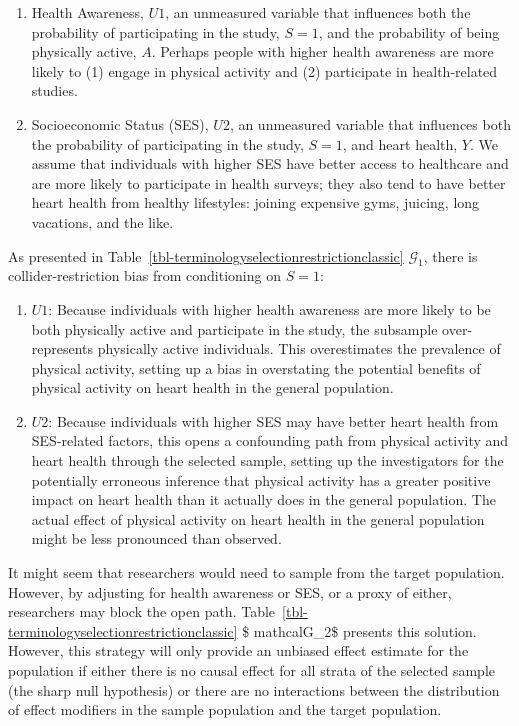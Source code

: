 \documentclass[
  single column]{article}
\begin{document}
\begin{enumerate}
\def\labelenumi{\arabic{enumi}.}
\item
  Health Awareness, \(U1\), an unmeasured variable that influences both
  the probability of participating in the study, \(\boxed{S = 1}\), and
  the probability of being physically active, \(A\). Perhaps people with
  higher health awareness are more likely to (1) engage in physical
  activity and (2) participate in health-related studies.
\item
  Socioeconomic Status (SES), \(U2\), an unmeasured variable that
  influences both the probability of participating in the study,
  \(\boxed{S = 1}\), and heart health, \(Y\). We assume that individuals
  with higher SES have better access to healthcare and are more likely
  to participate in health surveys; they also tend to have better heart
  health from healthy lifestyles: joining expensive gyms, juicing, long
  vacations, and the like.
\end{enumerate}

As presented in Table~\ref{tbl-terminologyselectionrestrictionclassic}
\(\mathcal{G}_1\), there is collider-restriction bias from conditioning
on \(S=1\):

\begin{enumerate}
\def\labelenumi{\arabic{enumi}.}
\item
  \textbf{\(U1\)}: Because individuals with higher health awareness are
  more likely to be both physically active and participate in the study,
  the subsample over-represents physically active individuals. This
  overestimates the prevalence of physical activity, setting up a bias
  in overstating the potential benefits of physical activity on heart
  health in the general population.
\item
  \textbf{\(U2\)}: Because individuals with higher SES may have better
  heart health from SES-related factors, this opens a confounding path
  from physical activity and heart health through the selected sample,
  setting up the investigators for the potentially erroneous inference
  that physical activity has a greater positive impact on heart health
  than it actually does in the general population. The actual effect of
  physical activity on heart health in the general population might be
  less pronounced than observed.
\end{enumerate}

It might seem that researchers would need to sample from the target
population. However, by adjusting for health awareness or SES, or a
proxy of either, researchers may block the open path.
Table~\ref{tbl-terminologyselectionrestrictionclassic} \$ mathcalG\_2\$
presents this solution. However, this strategy will only provide an
unbiased effect estimate for the population if either there is no causal
effect for all strata of the selected sample (the sharp null hypothesis)
or there are no interactions between the distribution of effect
modifiers in the sample population and the target population.
\end{document}
